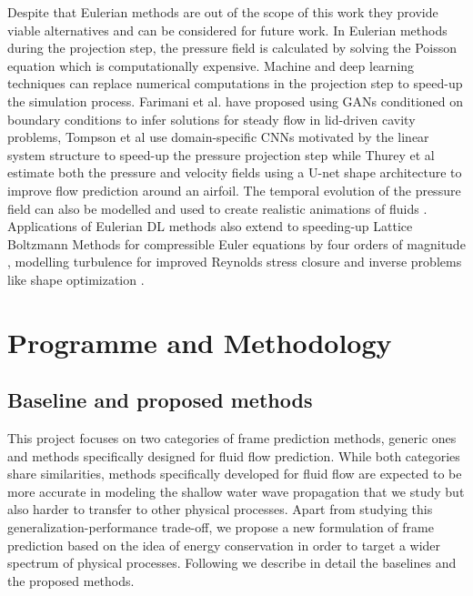 \documentclass[a4paper,11pt]{article}
\begin{document}
Despite that Eulerian methods are out of the scope of this work they provide viable alternatives and can be considered for future work. In Eulerian methods during the projection step, the pressure field is calculated by solving the Poisson equation which is computationally expensive. Machine and deep learning techniques can replace numerical computations in the projection step to speed-up the simulation process. Farimani et al. \cite{farimani2017deep} have proposed using GANs conditioned on boundary conditions to infer solutions for steady flow in lid-driven cavity problems, Tompson et al \cite{tompson2017accelerating} use domain-specific CNNs motivated by the linear system structure to speed-up the pressure projection step while Thurey et al \cite{thuerey2018well} estimate both the pressure and velocity fields using a U-net shape architecture to improve flow prediction around an airfoil. The temporal evolution of the pressure field can also be modelled and used to create realistic animations of fluids \cite{wiewel2018latent}. Applications of Eulerian DL methods also extend to speeding-up Lattice Boltzmann Methods for compressible Euler equations by four orders of magnitude \cite{guo2016convolutional}, modelling turbulence for improved Reynolds stress closure \cite{ling2016reynolds} and inverse problems like shape optimization \cite{umetani2018learning}.


\section{Programme and Methodology}\label{sec:3methods}
\subsection{Baseline and proposed methods}
\vskip -2mm

This project focuses on two categories of frame prediction methods, generic ones and methods specifically designed for fluid flow prediction. While both categories share similarities, methods specifically developed for fluid flow are expected to be more accurate in modeling the shallow water wave propagation that we study but also harder to transfer to other physical processes. Apart from studying this generalization-performance trade-off, we propose a new formulation of frame prediction based on the idea of energy conservation in order to target a wider spectrum of physical processes. Following we describe in detail the baselines and the proposed methods.
\end{document}
